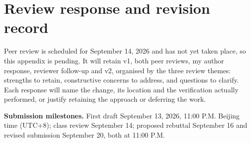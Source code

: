 \section{Review response and revision record}
\label{app:review}
Peer review is scheduled for September 14, 2026 and has not yet taken place, so this appendix is pending. It will retain v1, both peer reviews, my author response, reviewer follow-up and v2, organised by the three review themes: strengths to retain, constructive concerns to address, and questions to clarify. Each response will name the change, its location and the verification actually performed, or justify retaining the approach or deferring the work.

\textbf{Submission milestones.} First draft September 13, 2026, 11:00 P.M. Beijing time (UTC+8); class review September 14; proposed rebuttal September 16 and revised submission September 20, both at 11:00 P.M.

\clearpage\onecolumn
